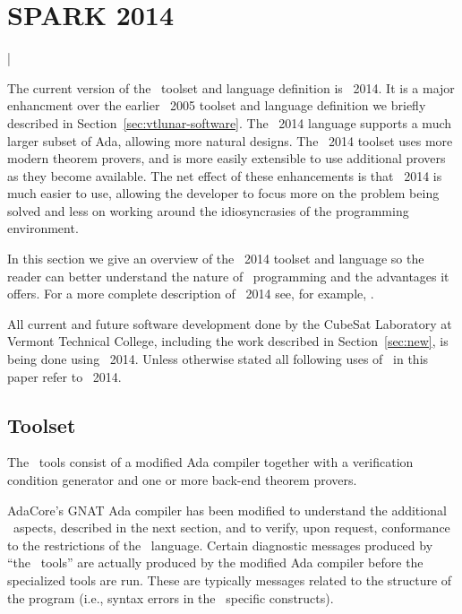 
\section{SPARK 2014}
\label{sec:spark2014}

\lstMakeShortInline|

The current version of the \SPARK\ toolset and language definition is \SPARK\ 2014. It is a
major enhancment over the earlier \SPARK\ 2005 toolset and language definition we briefly
described in Section~\ref{sec:vtlunar-software}. The \SPARK\ 2014 language supports a much
larger subset of Ada, allowing more natural designs. The \SPARK\ 2014 toolset uses more modern
theorem provers, and is more easily extensible to use additional provers as they become
available. The net effect of these enhancements is that \SPARK\ 2014 is much easier to use,
allowing the developer to focus more on the problem being solved and less on working around the
idiosyncrasies of the programming environment.

In this section we give an overview of the \SPARK\ 2014 toolset and language so the reader can
better understand the nature of \SPARK\ programming and the advantages it offers. For a more
complete description of \SPARK\ 2014 see, for example, \cite{McCormick-Chapin-2015}.

All current and future software development done by the CubeSat Laboratory at Vermont Technical
College, including the work described in Section~\ref{sec:new}, is being done using \SPARK\
2014. Unless otherwise stated all following uses of \SPARK\ in this paper refer to \SPARK\ 2014.

\subsection{Toolset}
\label{sec:spark2014-toolset}

The \SPARK\ tools consist of a modified Ada compiler together with a verification condition
generator and one or more back-end theorem provers.

AdaCore's GNAT Ada compiler has been modified to understand the additional \SPARK\ aspects,
described in the next section, and to verify, upon request, conformance to the restrictions of
the \SPARK\ language. Certain diagnostic messages produced by ``the \SPARK\ tools'' are actually
produced by the modified Ada compiler before the specialized tools are run. These are typically
messages related to the structure of the program (i.e., syntax errors in the \SPARK\ specific
constructs).

